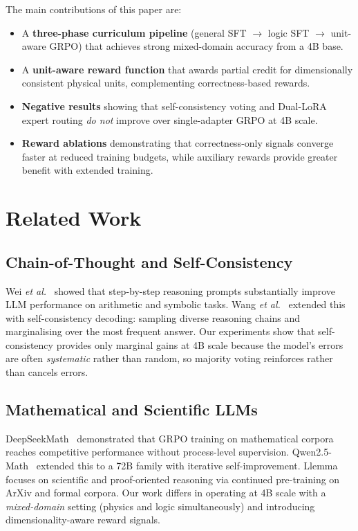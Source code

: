 \documentclass{ieeeaccess}
\begin{document}
The main contributions of this paper are:
\begin{itemize}
  \item A \textbf{three-phase curriculum pipeline}
        (general SFT $\to$ logic SFT $\to$ unit-aware GRPO) that achieves
        strong mixed-domain accuracy from a 4B base.
  \item A \textbf{unit-aware reward function} that awards partial credit
        for dimensionally consistent physical units, complementing
        correctness-based rewards.
  \item \textbf{Negative results} showing that self-consistency voting
        and Dual-LoRA expert routing \emph{do not} improve over
        single-adapter GRPO at 4B scale.
  \item \textbf{Reward ablations} demonstrating that correctness-only
        signals converge faster at reduced training budgets, while
        auxiliary rewards provide greater benefit with extended training.
\end{itemize}

\section{Related Work}
\label{sec:related}

\subsection{Chain-of-Thought and Self-Consistency}

Wei \emph{et al.}~\cite{Wei2022} showed that step-by-step reasoning
prompts substantially improve LLM performance on arithmetic and symbolic
tasks.
Wang \emph{et al.}~\cite{Wang2023sc} extended this with self-consistency
decoding: sampling diverse reasoning chains and marginalising over the most
frequent answer.
Our experiments show that self-consistency provides only marginal gains
at 4B scale because the model's errors are often \emph{systematic}
rather than random, so majority voting reinforces rather than cancels errors.

\subsection{Mathematical and Scientific LLMs}

DeepSeekMath~\cite{Shao2024} demonstrated that GRPO training on
mathematical corpora reaches competitive performance without
process-level supervision.
Qwen2.5-Math~\cite{Yang2024} extended this to a 72B family with
iterative self-improvement.
Llemma~\cite{Azerbayev2024} focuses on scientific and proof-oriented
reasoning via continued pre-training on ArXiv and formal corpora.
Our work differs in operating at 4B scale with a \emph{mixed-domain}
setting (physics and logic simultaneously) and introducing
dimensionality-aware reward signals.
\end{document}
